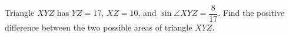 Triangle $XYZ$ has $YZ=17$, $XZ=10$, and $\sin\angle XYZ=\dfrac{8}{17}$. Find the positive difference between the two possible areas of triangle $XYZ$.
